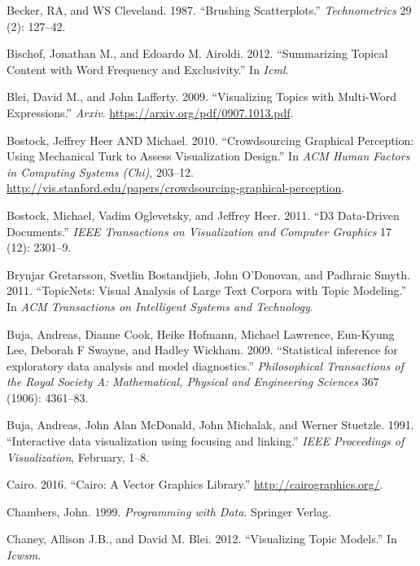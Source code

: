 \documentclass[12pt,]{isuthesis}
\begin{document}
\hypertarget{ref-brushing-scatterplots}{}
Becker, RA, and WS Cleveland. 1987. ``Brushing Scatterplots.''
\emph{Technometrics} 29 (2): 127--42.

\hypertarget{ref-Bischof}{}
Bischof, Jonathan M., and Edoardo M. Airoldi. 2012. ``Summarizing
Topical Content with Word Frequency and Exclusivity.'' In \emph{Icml}.

\hypertarget{ref-Blei-2009}{}
Blei, David M., and John Lafferty. 2009. ``Visualizing Topics with
Multi-Word Expressions.'' \emph{Arxiv}.
\url{https://arxiv.org/pdf/0907.1013.pdf}.

\hypertarget{ref-crowdsourcing-graphical-perception}{}
Bostock, Jeffrey Heer AND Michael. 2010. ``Crowdsourcing Graphical
Perception: Using Mechanical Turk to Assess Visualization Design.'' In
\emph{ACM Human Factors in Computing Systems (Chi)}, 203--12.
\url{http://vis.stanford.edu/papers/crowdsourcing-graphical-perception}.

\hypertarget{ref-d3}{}
Bostock, Michael, Vadim Oglevetsky, and Jeffrey Heer. 2011. ``D3
Data-Driven Documents.'' \emph{IEEE Transactions on Visualization and
Computer Graphics} 17 (12): 2301--9.

\hypertarget{ref-Gretarsson}{}
Brynjar Gretarsson, Svetlin Bostandjieb, John O'Donovan, and Padhraic
Smyth. 2011. ``TopicNets: Visual Analysis of Large Text Corpora with
Topic Modeling.'' In \emph{ACM Transactions on Intelligent Systems and
Technology}.

\hypertarget{ref-Buja:2009hp}{}
Buja, Andreas, Dianne Cook, Heike Hofmann, Michael Lawrence, Eun-Kyung
Lee, Deborah F Swayne, and Hadley Wickham. 2009. ``Statistical inference
for exploratory data analysis and model diagnostics.''
\emph{Philosophical Transactions of the Royal Society A: Mathematical,
Physical and Engineering Sciences} 367 (1906): 4361--83.

\hypertarget{ref-Buja:1991vh}{}
Buja, Andreas, John Alan McDonald, John Michalak, and Werner Stuetzle.
1991. ``Interactive data visualization using focusing and linking.''
\emph{IEEE Proceedings of Visualization}, February, 1--8.

\hypertarget{ref-cairo}{}
Cairo. 2016. ``Cairo: A Vector Graphics Library.''
\url{http://cairographics.org/}.

\hypertarget{ref-Chambers:1999}{}
Chambers, John. 1999. \emph{Programming with Data}. Springer Verlag.

\hypertarget{ref-Blei-2012}{}
Chaney, Allison J.B., and David M. Blei. 2012. ``Visualizing Topic
Models.'' In \emph{Icwsm}.
\end{document}
